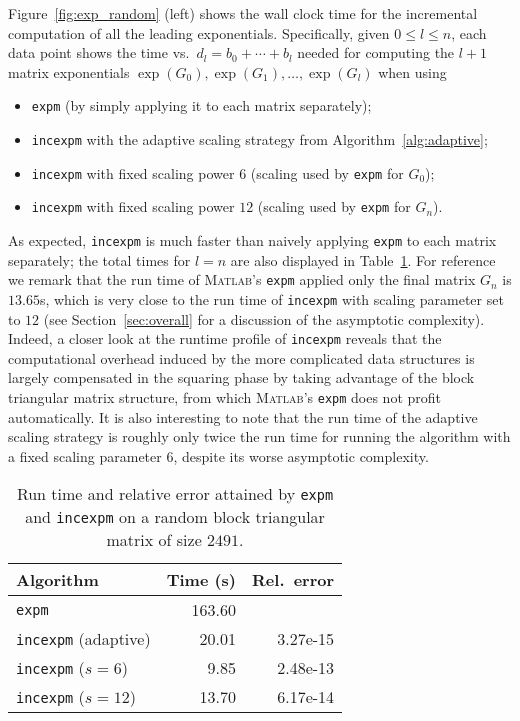 Figure~\ref{fig:exp_random} (left) shows the wall clock time for the
incremental computation of all the leading exponentials. 
Specifically, given $0 \le l \le n$, each data point shows the time vs.~$d_l = b_0 + \cdots + b_l$ needed for computing the $l+1$ matrix exponentials $\exp(G_0), \exp(G_1), \dotsc, \exp(G_l)$ when using
\begin{itemize}
 \item \texttt{expm} (by simply applying it to each matrix separately);
 \item \texttt{incexpm} with the adaptive scaling strategy from
Algorithm~\ref{alg:adaptive};
\item \texttt{incexpm} with fixed scaling power $6$ (scaling used by \texttt{expm} for $G_0$);
\item \texttt{incexpm} with fixed scaling power $12$ (scaling used by \texttt{expm} for $G_n$).
\end{itemize}
As expected, \texttt{incexpm} is much faster than naively applying
\texttt{expm} to each matrix separately; the total times for $l = n$
are also displayed in Table~\ref{tab:exp_random}.  For reference we
remark that the run time of \textsc{Matlab}'s \texttt{expm} applied
only the final matrix $G_n$ is $13.65$s, which is very close to the
run time of \texttt{incexpm} with scaling parameter set to $12$ (see
Section~\ref{sec:overall} for a discussion of the asymptotic
complexity).  Indeed, a closer look at the runtime profile of \texttt{incexpm}
reveals that the computational overhead induced by the more
complicated data structures is largely compensated in the squaring
phase by taking advantage of the block triangular matrix structure,
from which \textsc{Matlab}'s \texttt{expm} does not profit
automatically.  It is also interesting to note that the run time of
the adaptive scaling strategy is roughly only twice the run time for
running the algorithm with a fixed scaling parameter $6$, despite its
worse asymptotic complexity.
\begin{table}[t]
\centering
    \caption{Run time and relative error attained by
    \texttt{expm} and \texttt{incexpm} on a random block triangular
    matrix of size $2491$.\label{tab:exp_random}}
    \begin{tabular}{l|r|r}
        Algorithm                  & Time (s) & Rel.~error\\  \hline
        \texttt{expm}              & 163.60   &\\
        \texttt{incexpm} (adaptive)&  20.01   & 3.27e-15\\
        \texttt{incexpm} ($s=6$)   &   9.85   & 2.48e-13\\
        \texttt{incexpm} ($s=12$)  &  13.70   & 6.17e-14\\
    \end{tabular}
\end{table}

